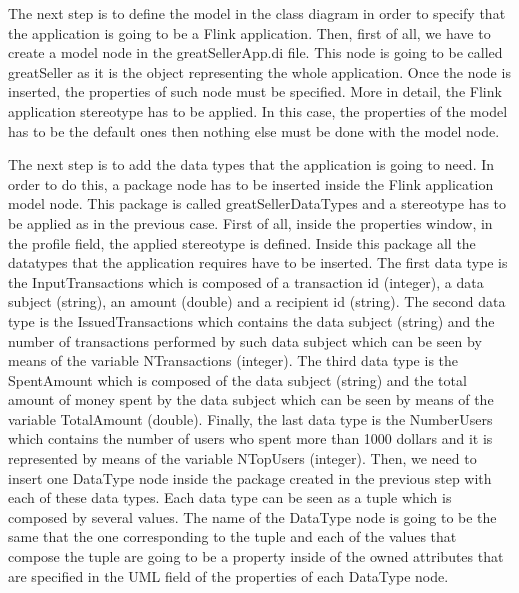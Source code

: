The next step is to define the model in the class diagram in order to specify that the application is going to be a Flink application. Then, first of all, we have to create a model node in the greatSellerApp.di file. This node is going to be called greatSeller as it is the object representing the whole application. Once the node is inserted, the properties of such node must be specified. More in detail, the Flink application stereotype has to be applied. In this case, the properties of the model has to be the default ones then nothing else must be done with the model node.

The next step is to add the data types that the application is going to need. In order to do this, a package node has to be inserted inside the Flink application model node. This package is called greatSellerDataTypes and a stereotype has to be applied as in the previous case. First of all, inside the properties window, in the profile field, the applied stereotype is defined. Inside this package all the datatypes that the application requires have to be inserted. The first data type is the InputTransactions which is composed of a transaction id (integer), a data subject (string), an amount (double) and a recipient id (string). The second data type is the IssuedTransactions which contains the data subject (string) and the number of transactions performed by such data subject which can be seen by means of the variable NTransactions (integer). The third data type is the SpentAmount which is composed of the data subject (string) and the total amount of money spent by the data subject which can be seen by means of the variable TotalAmount (double). Finally, the last data type is the NumberUsers which contains the number of users who spent more than 1000 dollars and it is represented by means of the variable NTopUsers (integer). Then, we need to insert one DataType node inside the package created in the previous step with each of these data types. Each data type can be seen as a tuple which is composed by several values. The name of the DataType node is going to be the same that the one corresponding to the tuple and each of the values that compose the tuple are going to be a property inside of the owned attributes that are specified in the UML field of the properties of each DataType node.

